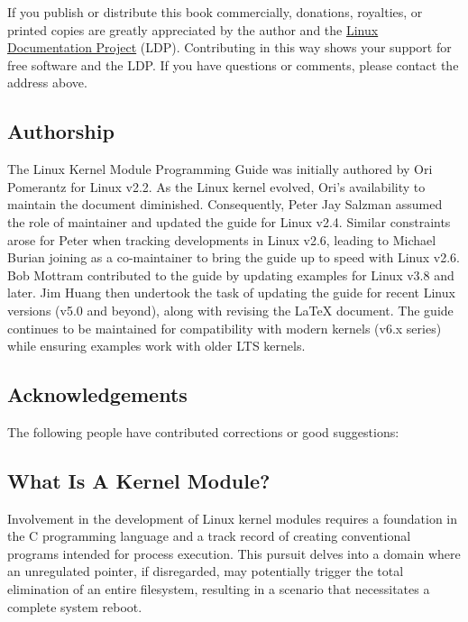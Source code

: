 \documentclass[10pt, oneside]{book}
\begin{document}
If you publish or distribute this book commercially, donations, royalties, or printed copies are greatly appreciated by the author and the \href{https://tldp.org/}{Linux Documentation Project} (LDP).
Contributing in this way shows your support for free software and the LDP. If you have questions or comments, please contact the address above.

\subsection{Authorship}
\label{sec:authorship}

The Linux Kernel Module Programming Guide was initially authored by Ori Pomerantz for Linux v2.2.
As the Linux kernel evolved, Ori's availability to maintain the document diminished.
Consequently, Peter Jay Salzman assumed the role of maintainer and updated the guide for Linux v2.4.
Similar constraints arose for Peter when tracking developments in Linux v2.6,
leading to Michael Burian joining as a co-maintainer to bring the guide up to speed with Linux v2.6.
Bob Mottram contributed to the guide by updating examples for Linux v3.8 and later.
Jim Huang then undertook the task of updating the guide for recent Linux versions (v5.0 and beyond),
along with revising the LaTeX document.
The guide continues to be maintained for compatibility with modern kernels (v6.x series) while ensuring examples work with older LTS kernels.

\subsection{Acknowledgements}
\label{sec:acknowledgements}

The following people have contributed corrections or good suggestions:

\begin{flushleft}

\end{flushleft}

\subsection{What Is A Kernel Module?}
\label{sec:kernelmod}

Involvement in the development of Linux kernel modules requires a foundation in the C programming language and a track record of creating conventional programs intended for process execution.
This pursuit delves into a domain where an unregulated pointer, if disregarded,
may potentially trigger the total elimination of an entire filesystem,
resulting in a scenario that necessitates a complete system reboot.
\end{document}
